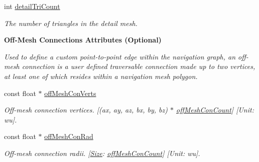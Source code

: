\begin{Indent}
\begin{DoxyCompactItemize}
\mbox{\label{structdtNavMeshCreateParams_a2516fa677dad99e0859ed46615d64730}} 
int \hyperlink{structdtNavMeshCreateParams_a2516fa677dad99e0859ed46615d64730}{detail\+Tri\+Count}
\begin{DoxyCompactList}\small\item\em The number of triangles in the detail mesh. \end{DoxyCompactList}\end{DoxyCompactItemize}
\end{Indent}
\begin{Indent}\textbf{ Off-\/\+Mesh Connections Attributes (Optional)}\par
{\em Used to define a custom point-\/to-\/point edge within the navigation graph, an off-\/mesh connection is a user defined traversable connection made up to two vertices, at least one of which resides within a navigation mesh polygon. }\begin{DoxyCompactItemize}
\item 
\mbox{\label{structdtNavMeshCreateParams_a885b42e01d478c8e6f0aa208d726d8bb}} 
const float $\ast$ \hyperlink{structdtNavMeshCreateParams_a885b42e01d478c8e6f0aa208d726d8bb}{off\+Mesh\+Con\+Verts}
\begin{DoxyCompactList}\small\item\em Off-\/mesh connection vertices. \mbox{[}(ax, ay, az, bx, by, bz) $\ast$ \hyperlink{structdtNavMeshCreateParams_adf244929dceba81df29f80f8869097c0}{off\+Mesh\+Con\+Count}\mbox{]} \mbox{[}Unit\+: wu\mbox{]}. \end{DoxyCompactList}\item 
\mbox{\label{structdtNavMeshCreateParams_aff91d0004902176a24c9cb76a5504e17}} 
const float $\ast$ \hyperlink{structdtNavMeshCreateParams_aff91d0004902176a24c9cb76a5504e17}{off\+Mesh\+Con\+Rad}
\begin{DoxyCompactList}\small\item\em Off-\/mesh connection radii. \mbox{[}\hyperlink{classSize}{Size}\+: \hyperlink{structdtNavMeshCreateParams_adf244929dceba81df29f80f8869097c0}{off\+Mesh\+Con\+Count}\mbox{]} \mbox{[}Unit\+: wu\mbox{]}. \end{DoxyCompactList}\item 
\mbox{\label{structdtNavMeshCreateParams_abf0a71ee2d79f033add88835a007398d}} 

\end{DoxyCompactItemize}
\end{Indent}
